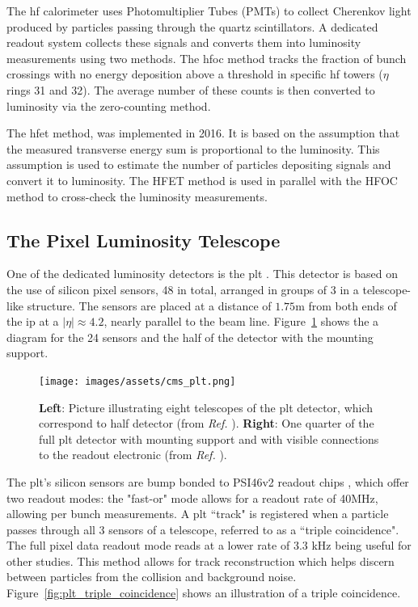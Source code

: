 The \acrshort{hf} calorimeter uses Photomultiplier Tubes (PMTs) to collect Cherenkov light produced by particles passing through the quartz scintillators. A dedicated readout system collects these signals and converts them into luminosity measurements using two methods. The \acrshort{hfoc} method tracks the fraction of bunch crossings with no energy deposition above a threshold in specific \acrshort{hf} towers ($\eta$ rings 31 and 32). The average number of these counts is then converted to luminosity via the zero-counting method.

The \acrshort{hfet} method, was implemented in 2016. It is based on the assumption that the measured transverse energy sum is proportional to the luminosity. This assumption is used to estimate the number of particles depositing signals and convert it to luminosity. The HFET method is used in parallel with the HFOC method to cross-check the luminosity measurements.

\subsection{The Pixel Luminosity Telescope}
\label{subsubsec:plt}

One of the dedicated luminosity detectors is the \acrfull{plt} \cite{CMS-DP-2021-020}. This detector is based on the use of silicon pixel sensors, 48 in total, arranged in groups of 3 in a telescope-like structure. The sensors are placed at a distance of $1.75$m from both ends of the \acrshort{ip} at a $|\eta| \approx 4.2$, nearly parallel to the beam line. Figure~\ref{fig:cms_plt} shows the a diagram for the 24 sensors and the half of the detector with the mounting support.

\begin{figure}[H]
	\centering
	\texttt{[image: images/assets/cms\_plt.png]}
	\caption[PLT detector telescopes]{\textbf{Left}: Picture illustrating eight telescopes of the \acrshort{plt} detector, which correspond to half detector (from \textit{Ref.} \cite{Romeo:2797807}). \textbf{Right}: One quarter of the full \acrshort{plt} detector with mounting support and with visible connections to the readout electronic (from \textit{Ref.} \cite{DelannoySotomayor:2765247}).}
	\label{fig:cms_plt}
\end{figure}

The \acrshort{plt}'s silicon sensors are bump bonded to PSI46v2 readout chips \cite{KASTLI2006188}, which offer two readout modes: the "fast-or" mode allows for a readout rate of 40MHz, allowing per bunch measurements. A \acrshort{plt} ``track" is registered when a particle passes through all 3 sensors of a telescope, referred to as a ``triple coincidence". The full pixel data readout mode reads at a lower rate of 3.3 kHz being useful for other studies. This method allows for track reconstruction which helps discern between particles from the collision and background noise. Figure~\ref{fig:plt_triple_coincidence} shows an illustration of a triple coincidence.

